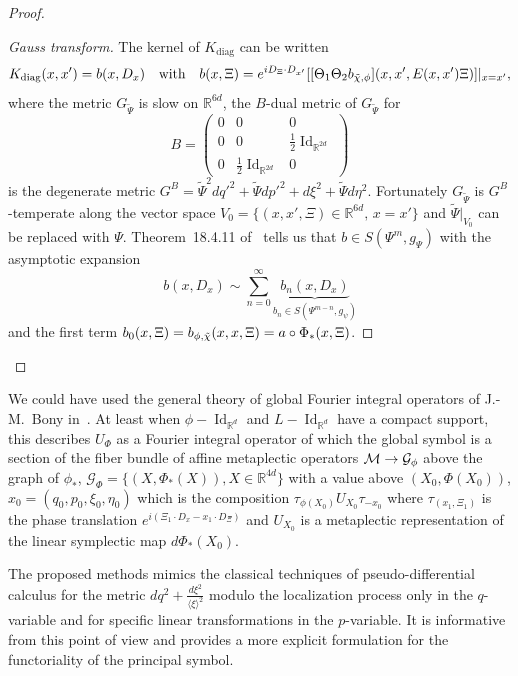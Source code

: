 \documentclass[AHL,Unicode,longabstracts]{cedram}
\newcommand{\R}{\mathbb{R}}
\newcommand{\clG}{\mathcal{G}}
\newcommand{\clM}{\mathcal{M}}
\DeclareMathOperator{\Idd}{Id}
\DeclareMathOperator{\diag}{diag}
\let\oldtilde\tilde
\renewcommand*{\tilde}[1]{\mathchoice{\widetilde{#1}}{\widetilde{#1}}{\oldtilde{#1}}{\oldtilde{#1}}}
\let\originalleft\left
\let\originalright\right
\renewcommand{\left}{\mathopen{}\mathclose\bgroup\originalleft}
\renewcommand{\right}{\aftergroup\egroup\originalright}
\renewcommand*{\to}{\mathchoice{\longrightarrow}{\rightarrow}{\rightarrow}{\rightarrow}}
\begin{document}
\begin{proof}
\begin{proof}[{Gauss transform}]
The kernel of $K_{\diag}$ can be written
\[
K_{\diag}(x,x')=b(x,D_{x})\quad\text{with}\quad b(x,\Xi)=e^{iD_{\Xi}\cdot
D_{x'}}
\left[[\Theta_{1}\Theta_{2}b_{\tilde\chi,\phi}](x,x',E(x,x')\Xi)\right]|_{x=x'},
\]
where the metric $G_{\widetilde{\Psi}}$ is slow on $\R^{6d}$, the $B$-dual metric of $G_{\widetilde{\Psi}}$ for
\[
B=
\begin{pmatrix}
0&0&0\\
0&0&\frac{1}{2}\Idd_{\R^{2d}}\\
0&\frac{1}{2}\Idd_{\R^{2d}}&0
\end{pmatrix}
\]
is the degenerate metric $G^{B}=\widetilde{\Psi}^{2}dq'^{2}+\widetilde{\Psi}dp'^{2}+d\xi^{2}+\widetilde{\Psi}d\eta^{2}$. Fortunately $G_{\widetilde{\Psi}}$ is $G^{B}$-temperate along the vector space $V_{0}=\{(x,x',\Xi)\in \R^{6d},\, x=x'\}$ and $\widetilde{\Psi}|_{V_{0}}$ can be replaced with $\Psi$. Theorem~18.4.11 of~\cite{HormIII} tells us that $b\in S(\Psi^{m},g_{\Psi})$ with the asymptotic expansion
\[
b(x,D_{x})\sim \sum_{n=0}^{\infty}\underbrace{b_{n}(x,D_{x})}_{b_{n}\in S(\Psi^{m-n},g_{\psi})}
\]
and the first term $b_{0}(x,\Xi)=b_{\phi,\tilde\chi}(x,x,\Xi)=a\circ\Phi_{*}(x,\Xi)$.
\end{proof}
\let\qed\relax
\end{proof}

\begin{rema}
We could have used the general theory of global Fourier integral operators of J.-M.~Bony in~\cite{Bon}. At least when $\phi-\Idd_{\R^{d}}$ and $L-\Idd_{\R^{d}}$ have a compact support, this describes $U_{\Phi}$ as a Fourier integral operator of which the global symbol is a section of the fiber bundle of affine metaplectic operators $\clM\to \clG_{\phi}$ above the graph of $\phi_{*}$, $\clG_{\Phi}=\{(X,\Phi_{*}(X)), X\in \R^{4d}\}$ with a value above $(X_{0},\Phi(X_{0}))$, $x_{0}=(q_{0},p_{0},\xi_{0},\eta_{0})$ which is the composition $\tau_{\phi(X_{0})}U_{X_{0}}\tau_{-x_{0}}$ where $\tau_{(x_{1},\Xi_{1})}$ is the phase translation $e^{i(\Xi_{1}\cdot D_{x}-x_{1}\cdot D_{\Xi})}$ and $U_{X_{0}}$ is a metaplectic representation of the linear symplectic map $d\Phi_{*}(X_{0})$.

The proposed methods mimics the classical techniques of pseudo-differential calculus for the metric $dq^{2}+\frac{d\xi^{2}}{\langle \xi\rangle^{2}}$ modulo the localization process only in the $q$-variable and for specific linear transformations in the $p$-variable. It is informative from this point of view and provides a more explicit formulation for the functoriality of the principal symbol.
\end{rema}
\end{document}
